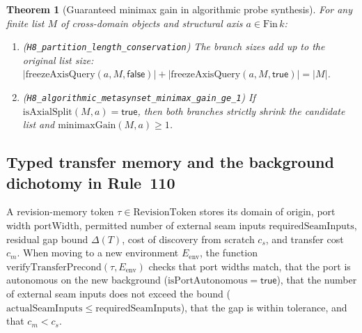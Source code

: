 \documentclass[11pt,a4paper]{article}
\theoremstyle{cleanthm}
\newtheorem{theorem}{Theorem}[section]
\DeclareRobustCommand{\id}[1]{\allowbreak\nolinkurl{#1}\allowbreak}
\begin{document}
\begin{theorem}[Guaranteed minimax gain in algorithmic probe synthesis]
\label{thm:h8_metasynset}
For any finite list $M$ of cross-domain objects and structural axis $a\in\mathrm{Fin}\,k$:
\begin{enumerate}
\item (\id{H8_partition_length_conservation}) The branch sizes add up to the original list size: $|\mathrm{freezeAxisQuery}(a,M,\mathsf{false})|+|\mathrm{freezeAxisQuery}(a,M,\mathsf{true})|=|M|$.
\item (\id{H8_algorithmic_metasynset_minimax_gain_ge_1}) If $\mathrm{isAxialSplit}(M,a)=\mathsf{true}$, then both branches strictly shrink the candidate list and $\mathrm{minimaxGain}(M,a)\ge1$.
\end{enumerate}
\end{theorem}

\subsection{Typed transfer memory and the background dichotomy in Rule~110}
A revision-memory token $\tau\in\mathrm{RevisionToken}$ stores its domain of origin, port width $\mathrm{portWidth}$, permitted number of external seam inputs $\mathrm{requiredSeamInputs}$, residual gap bound $\Delta(T)$, cost of discovery from scratch $c_s$, and transfer cost $c_m$. When moving to a new environment $E_{\mathrm{env}}$, the function $\mathrm{verifyTransferPrecond}(\tau,E_{\mathrm{env}})$ checks that port widths match, that the port is autonomous on the new background ($\mathrm{isPortAutonomous}=\mathsf{true}$), that the number of external seam inputs does not exceed the bound ($\mathrm{actualSeamInputs}\le\mathrm{requiredSeamInputs}$), that the gap is within tolerance, and that $c_m<c_s$.
\end{document}
